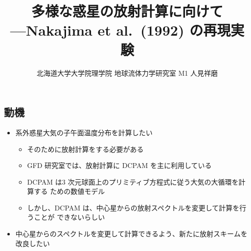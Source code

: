 \documentclass[aspectratio=149]{beamer}
\author{北海道大学大学院理学院 地球流体力学研究室 M1 人見祥磨}
\title{多様な惑星の放射計算に向けて\\---Nakajima et al.\ (1992) の再現実験}
\begin{document}
\begin{frame}
	\maketitle
\end{frame}

\begin{frame}
	\section{動機}
	\begin{itemize}
		\item 系外惑星大気の子午面温度分布を計算したい
			\begin{itemize}
				\item そのために放射計算をする必要がある
				\item GFD 研究室では、放射計算に DCPAM を主に利用している
				\item DCPAM は3 次元球面上のプリミティブ方程式に従う大気の大循環を計算する
					ための数値モデル
				\item しかし、DCPAM は、中心星からの放射スペクトルを変更して計算を行うことが
					できないらしい
			\end{itemize}
		\item 中心星からのスペクトルを変更して計算できるよう、新たに放射スキームを
			改良したい
	\end{itemize}
\end{frame}
\end{document}
